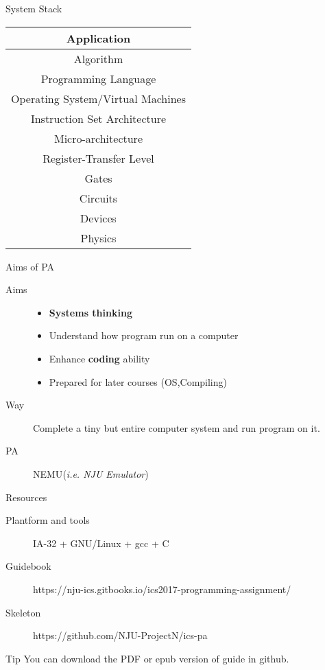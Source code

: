 \documentclass[handout]{beamer}
\begin{document}
\begin{frame}{System Stack}
\begin{table}
	\centering
	\begin{tabular}{|c|}
		\hline
		Application \\	
		\hline
		Algorithm\\
		\hline
		Programming Language\\
		\hline
		Operating System/Virtual Machines\\
		\hline
		\alert{Instruction Set Architecture}		\\
		\hline
		Micro-architecture\\
		\hline
		Register-Transfer Level\\
		\hline
		Gates\\
		\hline
		Circuits\\
		\hline
		Devices\\
		\hline
		Physics\\
		\hline
	\end{tabular}
\end{table}
\end{frame}



\begin{frame}{Aims of PA}
	\begin{description}
		\item[Aims]
		\begin{itemize}
		\item	\textbf{Systems thinking}
		\item	Understand how program run on a computer
		\item	Enhance \textbf{coding} ability
		\item	Prepared for later courses (OS,Compiling)
		\end{itemize}
		\pause
		\item[Way]Complete a tiny but entire computer system and run program on it.
		\pause
		\item[PA] \alert{\huge NEMU}(\textit{i.e. NJU Emulator})
	\end{description}
\end{frame}



\begin{frame}{Resources}
	\begin{description}
		\item [Plantform and tools] IA-32 + GNU/Linux + gcc + C	
		\item [Guidebook] https://nju-ics.gitbooks.io/ics2017-programming-assignment/
		\item [Skeleton]https://github.com/NJU-ProjectN/ics-pa
	\end{description}
	\begin{alertblock}{Tip}
		You can download the PDF or epub version of guide in github.
	\end{alertblock}
\end{frame}
\end{document}

